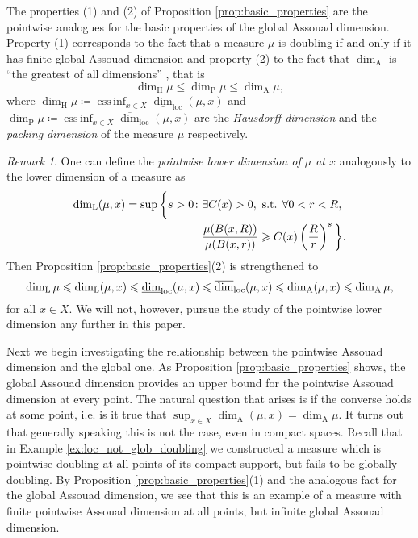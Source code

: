\documentclass{PRM}
\newcommand{\updim}{\overline{\dim}}
\newcommand{\lowdim}{\underline{\dim}}
\newcommand{\adim}{\dim_{\mathrm{A}}}
\DeclareMathOperator*{\essinf}{ess\,inf}
\theoremstyle{plain}
\theoremstyle{definition}
\theoremstyle{remark}
\newtheorem{huom}[thm]{Remark}
\begin{document}
The properties (1) and (2) of Proposition \ref{prop:basic_properties} are the pointwise analogues for the basic properties of the global Assouad dimension. Property (1) corresponds to the fact that a measure $\mu$ is doubling if and only if it has finite global Assouad dimension and property (2) to the fact that $\adim$ is ``the greatest of all dimensions'' \cite{F}, that is
\begin{equation*}
    \dim_{\mathrm{H}}\mu\leq \dim_{\mathrm{P}}\mu\leq\adim\mu,
\end{equation*}
where $\dim_{\mathrm{H}}\mu\coloneqq\essinf_{x\in X}\lowdim_{\mathrm{loc}}(\mu,x)$ and $\dim_{\mathrm{P}}\mu\coloneqq\essinf_{x\in X}\updim_{\mathrm{loc}}(\mu,x)$ are the \emph{Hausdorff dimension} and the \emph{packing dimension} of the measure $\mu$ respectively.

\begin{huom}
One can define the \emph{pointwise lower dimension of $\mu$ at $x$} analogously to the lower dimension of a measure as
\begin{align*}
    \dim_{\mathrm{L}}(\mu,x)=\sup\bigg\{s>0\colon &\exists C(x)>0,\textnormal{ s.t. }\forall0<r<R,\\
    &\frac{\mu(B(x,R))}{\mu(B(x,r))}\geq C(x)\left(\frac{R}{r}\right)^s\bigg\}.
\end{align*}
Then Proposition \ref{prop:basic_properties}(2) is strengthened to 
\begin{equation*}
    \dim_{\mathrm{L}}\mu\leq\dim_{\mathrm{L}}(\mu,x)\leq\lowdim_{\textnormal{loc}}(\mu,x)\leq\updim_{\textnormal{loc}}(\mu,x)\leq \dim_{\mathrm{A}}(\mu,x)\leq\adim\mu,
\end{equation*}
for all $x\in X$. We will not, however, pursue the study of the pointwise lower dimension any further in this paper.
\end{huom}


Next we begin investigating the relationship between the pointwise Assouad dimension and the global one. As Proposition \ref{prop:basic_properties} shows, the global Assouad dimension provides an upper bound for the pointwise Assouad dimension at every point. The natural question that arises is if the converse holds at some point, i.e. is it true that $\sup_{x\in X}\adim(\mu,x)=\adim\mu$. It turns out that generally speaking this is not the case, even in compact spaces. Recall that in Example \ref{ex:loc_not_glob_doubling}  we constructed a measure which is pointwise doubling at all points of its compact support, but fails to be globally doubling. By Proposition \ref{prop:basic_properties}(1) and the analogous fact for the global Assouad dimension, we see that this is an example of a measure with finite pointwise Assouad dimension at all points, but infinite global Assouad dimension.
\end{document}
